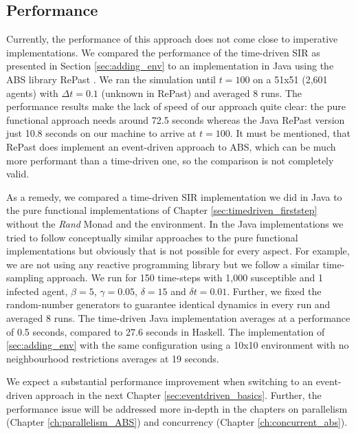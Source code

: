 \subsection{Performance}
Currently, the performance of this approach does not come close to imperative implementations. We compared the performance of the time-driven SIR as presented in Section \ref{sec:adding_env} to an implementation in Java using the ABS library RePast \cite{north_complex_2013}. We ran the simulation until $t = 100$ on a 51x51 (2,601 agents) with $\Delta t = 0.1$ (unknown in RePast) and averaged 8 runs. The performance results make the lack of speed of our approach quite clear: the pure functional approach needs around 72.5 seconds whereas the Java RePast version just 10.8 seconds on our machine to arrive at $t = 100$. It must be mentioned, that RePast does implement an event-driven approach to ABS, which can be much more performant \cite{meyer_event-driven_2014} than a time-driven one, so the comparison is not completely valid.

As a remedy, we compared a time-driven SIR implementation we did in Java to the pure functional implementations of Chapter \ref{sec:timedriven_firststep} without the \textit{Rand} Monad and the environment. In the Java implementations we tried to follow conceptually similar approaches to the pure functional implementations but obviously that is not possible for every aspect. For example, we are not using any reactive programming library but we follow a similar time-sampling approach. We run for 150 time-steps with 1,000 susceptible and 1 infected agent, $\beta = 5$, $\gamma = 0.05$, $\delta = 15$ and $\delta t = 0.01$. Further, we fixed the random-number generators to guarantee identical dynamics in every run and averaged 8 runs. The time-driven Java implementation averages at a performance of 0.5 seconds, compared to 27.6 seconds in Haskell. The implementation of \ref{sec:adding_env} with the same configuration using a 10x10 environment with no neighbourhood restrictions averages at 19 seconds.

We expect a substantial performance improvement when switching to an event-driven approach \cite{meyer_event-driven_2014} in the next Chapter \ref{sec:eventdriven_basics}. Further, the performance issue will be addressed more in-depth in the chapters on parallelism (Chapter \ref{ch:parallelism_ABS}) and concurrency (Chapter \ref{ch:concurrent_abs}).